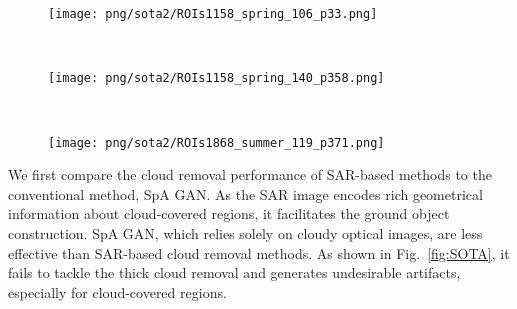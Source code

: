 \documentclass[a4paper,fleqn]{cas-dc}
\begin{document}
 \def\sswidth{0.95\textwidth}
\begin{figure*}[!t]
    \centering
    \begin{subfigure}[b]{\sswidth}
     \centering
     \texttt{[image: png/sota2/ROIs1158\_spring\_106\_p33.png]}
    \end{subfigure}
    \vspace{1.5mm}
    \\
    \begin{subfigure}[b]{\sswidth}
     \centering
     \texttt{[image: png/sota2/ROIs1158\_spring\_140\_p358.png]}
    \end{subfigure}
    \vspace{1.5mm}
    \\
    \begin{subfigure}[b]{\sswidth}
     \centering
     \texttt{[image: png/sota2/ROIs1868\_summer\_119\_p371.png]}
    \end{subfigure}
    \vspace{0mm}
    \caption{Qualitative results of cloud removal for 3 different scenes. For each scene, from top-left to bottom-right are respectively the cloudy image, the SAR image, the result from SpA GAN,  SAR2OPT, SAR-Opt-cGAN, Simulation-Fusion GAN (SF GAN), DSen2-CR, {\it Concat}, GLF-CR, and the cloud-free image. The size of each image is  pixels.}	
    \label{fig:SOTA}
    \vspace{-3mm}
\end{figure*}




















%
 
We first compare the cloud removal performance of SAR-based methods to the conventional method, SpA GAN. As the SAR image encodes rich geometrical information about cloud-covered regions, it facilitates the ground object construction. SpA GAN, which relies solely on cloudy optical images, are less effective than SAR-based cloud removal methods.
As shown in Fig.~\ref{fig:SOTA},
it fails to tackle the thick cloud removal and generates undesirable artifacts, especially for cloud-covered regions.
\end{document}
